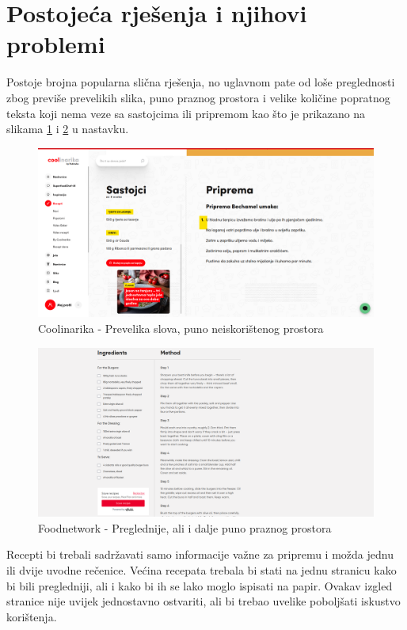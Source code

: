 		\section{Postojeća rješenja i njihovi problemi}
		Postoje brojna popularna slična rješenja, no uglavnom pate od loše preglednosti zbog previše prevelikih slika, puno praznog prostora i velike količine popratnog teksta koji nema veze sa sastojcima ili pripremom kao što je prikazano na slikama \ref{fig:primjer1} i \ref{fig:primjer2} u nastavku. 
		\begin{figure}[H]
			\includegraphics[scale=0.24]{slike/primjer_coolinarika.png}
			\centering
			\caption{Coolinarika - Prevelika slova, puno neiskorištenog prostora}
			\label{fig:primjer1}
		\end{figure}
		\begin{figure}[H]
			\includegraphics[scale=0.24]{slike/primjer_foodnetwork.png}
			\centering
			\caption{Foodnetwork - Preglednije, ali i dalje puno praznog prostora}
			\label{fig:primjer2}
		\end{figure}
		Recepti bi trebali sadržavati samo informacije važne za pripremu i možda jednu ili dvije uvodne rečenice. Većina recepata trebala bi stati na jednu stranicu kako bi bili pregledniji, ali i kako bi ih se lako moglo ispisati na papir. Ovakav izgled stranice nije uvijek jednostavno ostvariti, ali bi trebao uvelike poboljšati iskustvo korištenja.
